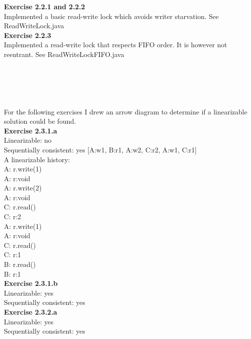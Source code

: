 \documentclass{article}
\begin{document}
\noindent \textbf{Exercise 2.2.1 and 2.2.2} \\

Implemented a basic read-write lock which avoids writer starvation. See ReadWriteLock.java
\\

\noindent \textbf{Exercise 2.2.3} \\

Implemented a read-write lock that respects FIFO order. It is however not reentrant. See ReadWriteLockFIFO.java
\\ \\ \\ \\ \\ \\

For the following exercises I drew an arrow diagram to determine if a linearizable solution could be found. \\

\noindent \textbf{Exercise 2.3.1.a} \\

\noindent Linearizable: no\\
Sequentially consistent: yes [A:w1, B:r1, A:w2, C:r2, A:w1, C:r1]\\

\noindent A linearizable history: \\

A: r.write(1) \\
A: r:void \\
A: r.write(2) \\
A: r:void \\
C: r.read() \\
C: r:2 \\
A: r.write(1) \\
A: r:void \\
C: r.read() \\
C: r:1 \\
B: r.read() \\
B: r:1 \\

\noindent \textbf{Exercise 2.3.1.b} \\

\noindent Linearizable: yes \\
Sequentially consistent: yes \\

\noindent \textbf{Exercise 2.3.2.a} \\

\noindent Linearizable: yes \\
Sequentially consistent: yes \\
\end{document}
